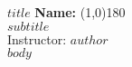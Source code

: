 \documentclass[10pt]{article}
\begin{document}
\textbf{$title$} \hspace*{2in} \textbf{Name:} \line(1,0){180}\\
$subtitle$\\
Instructor: $author$\\

$body$
\end{document}
